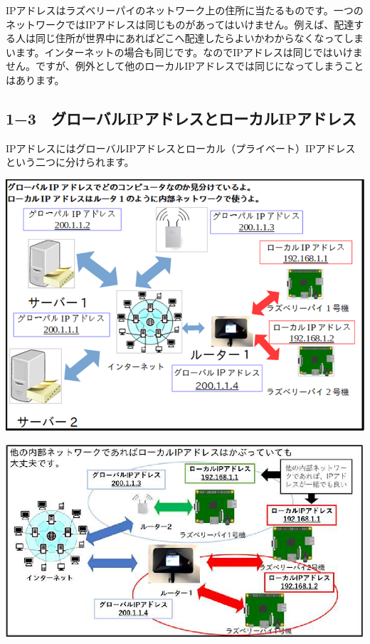 \documentclass[a4paper,12pt,dvipdfmx]{jarticle}
\begin{document}
\bigskip


\bigskip


\bigskip


\bigskip


\bigskip

IPアドレスはラズベリーパイのネットワーク上の住所に当たるものです。一つのネットワークではIPアドレスは同じものがあってはいけません。例えば、配達する人は同じ住所が世界中にあればどこへ配達したらよいかわからなくなってしまいます。インターネットの場合も同じです。なのでIPアドレスは同じではいけません。ですが、例外として他のローカルIPアドレスでは同じになってしまうことはあります。%

\clearpage\subsection*{\bfseries
	1−3　グローバルIPアドレスとローカルIPアドレス}
IPアドレスにはグローバルIPアドレスとローカル（プライベート）IPアドレスという二つに分けられます。



\centering
\includegraphics[width=15.0cm]{ome7-img005.png}

\centering
\includegraphics[width=15.0cm]{ome7-img006}
\flushleft
\end{document}
